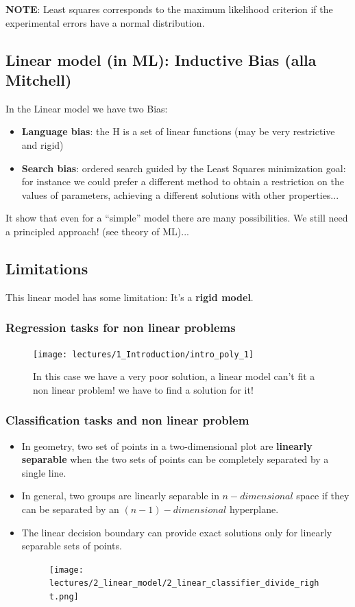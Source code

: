 \documentclass[../main.tex]{subfiles}
\begin{document}
\noindent\textbf{NOTE}: Least squares corresponds to the maximum likelihood criterion if the
experimental errors have a normal distribution.

\subsection{Linear model (in ML): Inductive Bias (alla Mitchell)}
In the Linear model we have two Bias:
\begin{itemize}
    \item \textbf{Language bias}: the H is a set of linear functions (may be very restrictive and rigid)

    \item \textbf{Search bias}: ordered search guided by the Least Squares minimization goal: for instance we could prefer a different method to obtain a restriction on the values of parameters, achieving a different solutions with other properties...

\end{itemize}

It show that even for a “simple” model there are many possibilities. We still need a principled approach! (see theory of ML)...

\subsection{Limitations}
This linear model has some limitation: It's a \textbf{rigid model}.

\subsubsection*{Regression tasks for non linear problems}
\begin{figure}[H]
    \centering
    \texttt{[image: lectures/1\_Introduction/intro\_poly\_1]}
    \caption{\scriptsize In this case we have a very poor solution, a linear model can't fit a non linear problem! we have to find a solution for it!}
    \label{fig:2task_poor}
\end{figure}

\subsubsection*{Classification tasks and non linear problem}
\begin{itemize}
    \item In geometry, two set of points in a two-dimensional plot are \textbf{linearly separable} when the two sets of points can be completely separated by a single line.
    \item In general, two groups are linearly separable in $n-dimensional$ space if they can be separated by an $(n-1)-dimensional$ hyperplane.
    \item The linear decision boundary can provide exact solutions only for linearly separable sets of points.
    \begin{figure}[H]
        \centering
        \texttt{[image: lectures/2\_linear\_model/2\_linear\_classifier\_divide\_right.png]}
    \end{figure}
\end{itemize}
\end{document}
